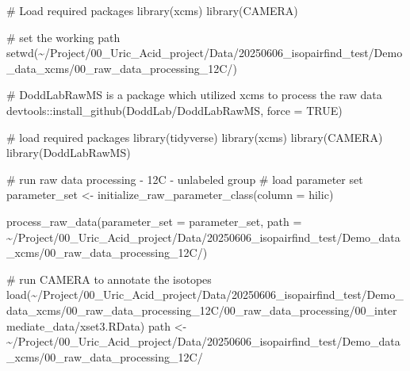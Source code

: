 \documentclass[
  letterpaper,
  DIV=11,
  numbers=noendperiod]{scrreprt}
\newenvironment{Shaded}{\begin{snugshade}}{\end{snugshade}}
\newcommand{\AttributeTok}[1]{\textcolor[rgb]{0.40,0.45,0.13}{#1}}
\newcommand{\CommentTok}[1]{\textcolor[rgb]{0.37,0.37,0.37}{#1}}
\newcommand{\ConstantTok}[1]{\textcolor[rgb]{0.56,0.35,0.01}{#1}}
\newcommand{\FunctionTok}[1]{\textcolor[rgb]{0.28,0.35,0.67}{#1}}
\newcommand{\NormalTok}[1]{\textcolor[rgb]{0.00,0.23,0.31}{#1}}
\newcommand{\OtherTok}[1]{\textcolor[rgb]{0.00,0.23,0.31}{#1}}
\newcommand{\SpecialCharTok}[1]{\textcolor[rgb]{0.37,0.37,0.37}{#1}}
\newcommand{\StringTok}[1]{\textcolor[rgb]{0.13,0.47,0.30}{#1}}
\begin{document}
\begin{Shaded}
\begin{Highlighting}[]
\CommentTok{\# Load required packages}
\FunctionTok{library}\NormalTok{(xcms)}
\FunctionTok{library}\NormalTok{(CAMERA)}

\CommentTok{\# set the working path}
\FunctionTok{setwd}\NormalTok{(}\StringTok{\textquotesingle{}\textasciitilde{}/Project/00\_Uric\_Acid\_project/Data/20250606\_isopairfind\_test/Demo\_data\_xcms/00\_raw\_data\_processing\_12C/\textquotesingle{}}\NormalTok{)}

\CommentTok{\# DoddLabRawMS is a package which utilized xcms to process the raw data}
\NormalTok{devtools}\SpecialCharTok{::}\FunctionTok{install\_github}\NormalTok{(}\StringTok{\textquotesingle{}DoddLab/DoddLabRawMS\textquotesingle{}}\NormalTok{, }\AttributeTok{force =} \ConstantTok{TRUE}\NormalTok{)}

\CommentTok{\# load required packages}
\FunctionTok{library}\NormalTok{(tidyverse)}
\FunctionTok{library}\NormalTok{(xcms)}
\FunctionTok{library}\NormalTok{(CAMERA)}
\FunctionTok{library}\NormalTok{(DoddLabRawMS)}

\CommentTok{\# run raw data processing {-} 12C {-} unlabeled group}
\CommentTok{\# load parameter set}
\NormalTok{parameter\_set }\OtherTok{\textless{}{-}} \FunctionTok{initialize\_raw\_parameter\_class}\NormalTok{(}\AttributeTok{column =} \StringTok{\textquotesingle{}hilic\textquotesingle{}}\NormalTok{)}

\FunctionTok{process\_raw\_data}\NormalTok{(}\AttributeTok{parameter\_set =}\NormalTok{ parameter\_set, }
                 \AttributeTok{path =} \StringTok{\textquotesingle{}\textasciitilde{}/Project/00\_Uric\_Acid\_project/Data/20250606\_isopairfind\_test/Demo\_data\_xcms/00\_raw\_data\_processing\_12C/\textquotesingle{}}\NormalTok{)}


\CommentTok{\# run CAMERA to annotate the isotopes}
\FunctionTok{load}\NormalTok{(}\StringTok{\textquotesingle{}\textasciitilde{}/Project/00\_Uric\_Acid\_project/Data/20250606\_isopairfind\_test/Demo\_data\_xcms/00\_raw\_data\_processing\_12C/00\_raw\_data\_processing/00\_intermediate\_data/xset3.RData\textquotesingle{}}\NormalTok{)}
\NormalTok{path }\OtherTok{\textless{}{-}} \StringTok{\textquotesingle{}\textasciitilde{}/Project/00\_Uric\_Acid\_project/Data/20250606\_isopairfind\_test/Demo\_data\_xcms/00\_raw\_data\_processing\_12C/\textquotesingle{}}


\end{Highlighting}
\end{Shaded}
\end{document}
